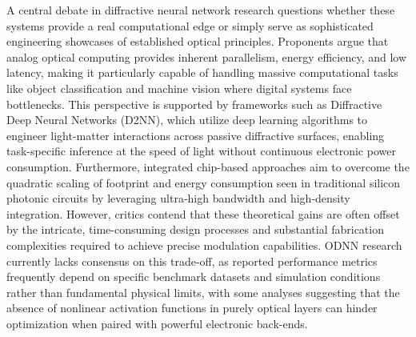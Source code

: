\documentclass[11pt]{article}
\begin{document}
A central debate in diffractive neural network research questions whether these systems provide a real computational edge or simply serve as sophisticated engineering showcases of established optical principles. Proponents argue that analog optical computing provides inherent parallelism, energy efficiency, and low latency, making it particularly capable of handling massive computational tasks like object classification and machine vision where digital systems face bottlenecks. This perspective is supported by frameworks such as Diffractive Deep Neural Networks (D2NN), which utilize deep learning algorithms to engineer light-matter interactions across passive diffractive surfaces, enabling task-specific inference at the speed of light without continuous electronic power consumption. \citep{doi_10_1021_acsphotonics_4c01284_s001_10346917} Furthermore, integrated chip-based approaches aim to overcome the quadratic scaling of footprint and energy consumption seen in traditional silicon photonic circuits by leveraging ultra-high bandwidth and high-density integration. However, critics contend that these theoretical gains are often offset by the intricate, time-consuming design processes and substantial fabrication complexities required to achieve precise modulation capabilities. ODNN research currently lacks consensus on this trade-off, as reported performance metrics frequently depend on specific benchmark datasets and simulation conditions rather than fundamental physical limits, with some analyses suggesting that the absence of nonlinear activation functions in purely optical layers can hinder optimization when paired with powerful electronic back-ends. \citep{doi_10_3390_nano14221812_4d7d91b1} \citep{doi_10_1515_nanoph_2022_0358_04e3cc8d} \citep{doi_10_1038_s41467_022_28702_0_1b79b43c} \citep{doi_10_1109_jstqe_2019_2921376_c2bef7d6}
\end{document}
